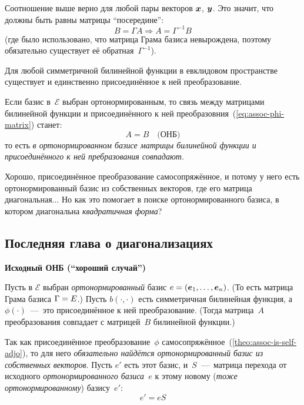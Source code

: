 \documentclass[a4paper,12pt]{article}
\theoremstyle{remark}
\begin{document}
  Соотношение выше верно для любой пары векторов $\boldsymbol x$, $\boldsymbol y$.
  Это значит, что должны быть равны матрицы ``посередине'':
  \begin{equation}\label{eq:assoc-phi-matrix}
    B = \Gamma A \Rightarrow \boxed{A = \Gamma^{-1} B}
  \end{equation}
  (где было использовано, что матрица Грама базиса невырождена, поэтому обязательно существует её обратная~$\Gamma^{-1}$).
  
  \begin{proposition}
    Для любой симметричной билинейной функции в евклидовом пространстве существует и единственно присоединённое к ней преобразование.
  \end{proposition}
  
  Если базис в~$\mathcal E$ выбран ортонормированным, то связь между матрицами билинейной функции и присоединённого к ней преобразовния~(\ref{eq:assoc-phi-matrix}) станет:
  \begin{equation}
    \boxed{A = B\quad \mbox{(ОНБ)}}
  \end{equation}
  то есть \emph{в ортонормированном базисе матрицы билинейной функции и присоединённого к ней пребразования совпадают}.
  
  Хорошо, присоединённое преобразование самосопряжённое, и потому у него есть ортонормированный базис из собственных векторов, где его матрица диагональная...
  Но как это помогает в поиске ортонормированного базиса, в котором диагональна \emph{квадратичная форма}?

  
  
  \newpage
  
  \subsection{Последняя глава о диагонализациях}
  
  \noindent
  \textbf{Исходный ОНБ (``хороший случай'')}

  Пусть в $\mathcal E$ выбран \emph{ортонормированный} базис $e \hm= (\bds e_1, \ldots, \bds e_n)$.
  (То есть матрица Грама базиса $\Gamma \hm= E$.)
  Пусть $b(\cdot, \cdot)$ есть симметричная билинейная функция, а $\phi(\cdot)$~---~это присоединённое к ней преобразование.
  (Тогда матрица~$A$ преобразования совпадает с матрицей~$B$ билинейной функции.)

  Так как присоединённое преобразование~$\phi$ самосопряжённое~(\ref{theo:assoc-is-self-adjo}), то для него \emph{обязательно найдётся ортонормированный базис из собственных векторов}.
  Пусть $e'$ есть этот базис, и~$S$~---~матрица перехода от исходного \emph{ортонормированного базиса~$e$} к этому новому (\emph{тоже ортонормированному}) базису~$e'$:
  \begin{equation}\label{eq:from-orthogo-to-orthogo-basis}
    e' = e S
  \end{equation}
  
\end{document}
